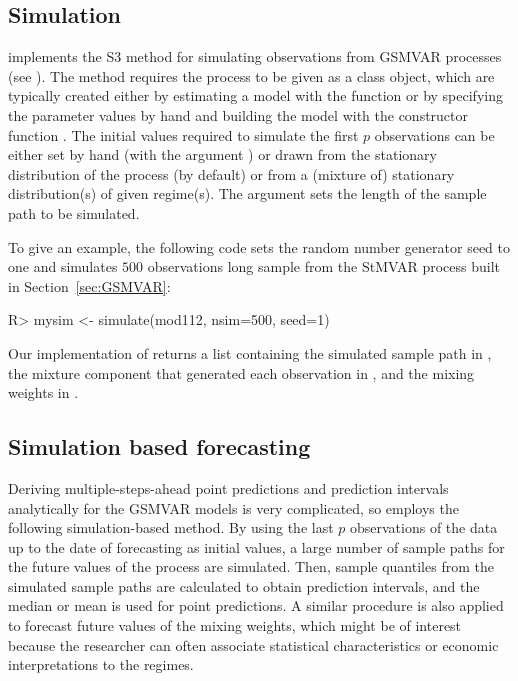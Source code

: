 \documentclass[nojss]{jss}
\begin{document}
\subsection{Simulation}\label{sec:simu}

 implements the S3 method  for simulating observations from GSMVAR processes (see ). The method requires the process to be given as a class  object, which are typically created either by estimating a model with the function  or by specifying the parameter values by hand and building the model with the constructor function . The initial values required to simulate the first $p$ observations can be either set by hand (with the argument ) or drawn from the stationary distribution of the process (by default) or from a (mixture of) stationary distribution(s) of given regime(s). The argument  sets the length of the sample path to be simulated.

To give an example, the following code sets the random number generator seed to one and simulates $500$ observations long sample from the StMVAR process built in Section~\ref{sec:GSMVAR}:
%
\begin{CodeChunk}
\begin{CodeInput}
R> mysim <- simulate(mod112, nsim=500, seed=1)
\end{CodeInput}
\end{CodeChunk}
%
Our implementation of  returns a list containing the simulated sample path in , the mixture component that generated each observation in , and the mixing weights in .

\subsection{Simulation based forecasting}

Deriving multiple-steps-ahead point predictions and prediction intervals analytically for the GSMVAR models is very complicated, so  employs the following simulation-based method. By using the last $p$ observations of the data up to the date of forecasting as initial values, a large number of sample paths for the future values of the process are simulated. Then, sample quantiles from the simulated sample paths are calculated to obtain prediction intervals, and the median or mean is used for point predictions. A similar procedure is also applied to forecast future values of the mixing weights, which might be of interest because the researcher can often associate statistical characteristics or economic interpretations to the regimes.
\end{document}
